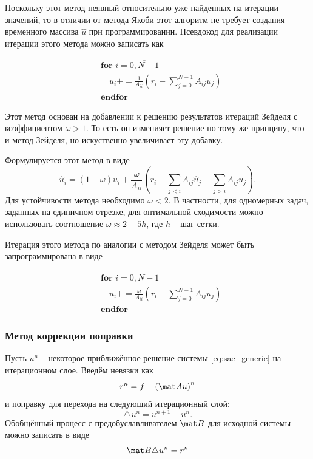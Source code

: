 Поскольку этот метод неявный относительно уже найденных на итерации значений, то в отличии от метода Якоби этот алгоритм не требует создания временного массива $\hat u$
при программировании. Псевдокод для реализации итерации этого метода можно записать как

\begin{align*}
    &\textbf{for } i=\overline{0, N-1} \\ 
    &\quad u_i \mathrel{{+}{=}} \frac{1}{A_{ii}}\left(r_i - \sum_{j=0}^{N-1} A_{ij}{u_j}\right)\\
    &\textbf{endfor}
\end{align*}


\label{sec:sae_sor}

Этот метод основан на добавлении к решению результатов итераций Зейделя с
коэффициентом $\omega > 1$. То есть он изменияет решение по тому же
принципу, что и метод Зейделя, но искуственно увеличивает эту добавку.

Формулируется этот метод в виде
\begin{equation*}
    \hat u_i = (1-\omega) u_i + \frac{\omega}{A_{ii}}\left(r_i - \sum_{j<i} A_{ij}{\hat u_j} - \sum_{j>i} A_{ij}{u_j} \right).
\end{equation*}
Для устойчивости метода необходимо $\omega < 2$. В частности, для одномерных задач,
заданных на единичном отрезке, для оптимальной сходимости можно использовать соотношение $\omega \approx 2 - 5 h$,
где $h$ -- шаг сетки.

Итерация этого метода по аналогии с методом Зейделя может быть запрограммирована в виде

\begin{align*}
    &\textbf{for } i=\overline{0, N-1} \\ 
    &\quad u_i \mathrel{{+}{=}} \frac{\omega}{A_{ii}}\left(r_i - \sum_{j=0}^{N-1} A_{ij}{u_j}\right)\\
    &\textbf{endfor}
\end{align*}

\subsubsection{Метод коррекции поправки}
\label{sec:it_def_corr}
Пусть $u^n$ -- некоторое приближённое решение системы \cref{eq:sae_generic} на итерационном слое.
Введём невязки как
\begin{equation}
\label{eq:sae_rn}
r^n = f - \left(\mat A u\right)^n
\end{equation}
и поправку для перехода на следующий итерационный слой:
\begin{equation*}
\triangle u^n = u^{n+1} - u^{n}.
\end{equation*}
Обобщённый процесс с предобуславливателем $\mat B$ для исходной системы можно записать в виде
\begin{equation}
\label{eq:sae_un_problem}
\mat B \triangle u^n = r^n
\end{equation}

